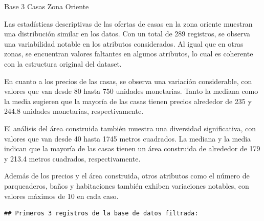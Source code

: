 \documentclass[
]{article}
\begin{document}
Base 3 Casas Zona Oriente

Las estadísticas descriptivas de las ofertas de casas en la zona oriente
muestran una distribución similar en los datos. Con un total de 289
registros, se observa una variabilidad notable en los atributos
considerados. Al igual que en otras zonas, se encuentran valores
faltantes en algunos atributos, lo cual es coherente con la estructura
original del dataset.

En cuanto a los precios de las casas, se observa una variación
considerable, con valores que van desde 80 hasta 750 unidades
monetarias. Tanto la mediana como la media sugieren que la mayoría de
las casas tienen precios alrededor de 235 y 244.8 unidades monetarias,
respectivamente.

El análisis del área construida también muestra una diversidad
significativa, con valores que van desde 40 hasta 1745 metros cuadrados.
La mediana y la media indican que la mayoría de las casas tienen un área
construida de alrededor de 179 y 213.4 metros cuadrados,
respectivamente.

Además de los precios y el área construida, otros atributos como el
número de parqueaderos, baños y habitaciones también exhiben variaciones
notables, con valores máximos de 10 en cada caso.

\begin{verbatim}
## Primeros 3 registros de la base de datos filtrada:
\end{verbatim}
\end{document}
